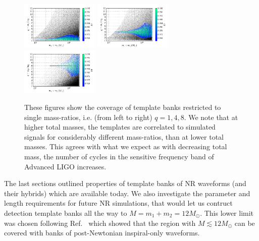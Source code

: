 
\begin{figure}
\begin{center}
\includegraphics[width=0.33\textwidth, trim=17 20 75 40]{bank_separate_q1_mtot200_match.png}
\includegraphics[width=0.33\textwidth, trim=17 20 75 40]{bank_separate_q4_mtot200_match.png}
\includegraphics[width=0.33\textwidth, trim=17 20 75 40]{bank_separate_q8_mtot200_match.png}
\caption{\label{fig:separate_q148} These figures show the coverage of template
  banks restricted to single mass-ratios, i.e. (from left to right) 
  $q = 1, 4, 8$. We note that at 
  higher total masses, the templates are correlated to simulated signals for
  considerably different mass-ratios, than at lower total masses. This agrees
  with what we expect as with decreasing total mass, the number of cycles in
  the sensitive frequency band of Advanced LIGO increases.} 
\end{center}
\end{figure}

The last sections outlined properties of template banks of NR
waveforms (and their hybrids) which are available today. 
We also investigate the parameter and length requirements for future NR 
simulations, that would let us contruct detection template banks all the
way to $M=m_1+m_2=12M_\odot$. This lower limit was chosen following 
Ref.~\cite{Brown:2012nn,CompTemplates2009} which showed that the region with
$M\lesssim 12M_\odot$ can be covered with banks of post-Newtonian inspiral-only
waveforms.

